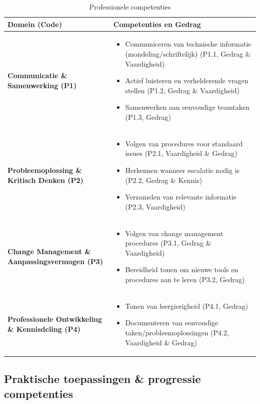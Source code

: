 \begin{table}[H]
	\centering
	\renewcommand{\arraystretch}{1.1}
	\begin{tabularx}{\textwidth}{|>{\bfseries\arraybackslash}p{3.5cm}|X|}
		\hline
		\textbf{Domein (Code)} & \textbf{Competenties en Gedrag} \\
		\hline
		Communicatie \& Samenwerking (P1) &
		\begin{itemize}
			\item Communiceren van technische informatie (mondeling/schriftelijk) (P1.1, Gedrag \& Vaardigheid)
			\item Actief luisteren en verhelderende vragen stellen (P1.2, Gedrag \& Vaardigheid)
			\item Samenwerken aan eenvoudige teamtaken (P1.3, Gedrag)
		\end{itemize} \\
		\hline
		Probleemoplossing \& Kritisch Denken (P2) &
		\begin{itemize}
			\item Volgen van procedures voor standaard issues (P2.1, Vaardigheid \& Gedrag)
			\item Herkennen wanneer escalatie nodig is (P2.2, Gedrag \& Kennis)
			\item Verzamelen van relevante informatie (P2.3, Vaardigheid)
		\end{itemize} \\
		\hline
		Change Management \& Aanpassingsvermogen (P3) &
		\begin{itemize}
			\item Volgen van change management procedures (P3.1, Gedrag \& Vaardigheid)
			\item Bereidheid tonen om nieuwe tools en procedures aan te leren (P3.2, Gedrag)
		\end{itemize} \\
		\hline
		Professionele Ontwikkeling \& Kennisdeling (P4) &
		\begin{itemize}
			\item Tonen van leergierigheid (P4.1, Gedrag)
			\item Documenteren van eenvoudige taken/probleemoplossingen (P4.2, Vaardigheid \& Gedrag)
		\end{itemize} \\
		\hline
	\end{tabularx}
	\caption{Professionele competenties}
	\label{tab:prof-competenties}
\end{table}

\subsection{Praktische toepassingen \& progressie competenties}

